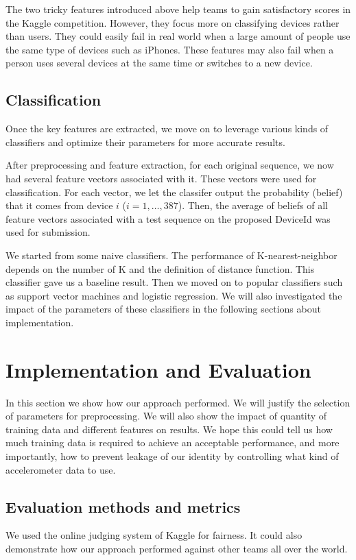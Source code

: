 \documentclass{article} %
\begin{document}
The two tricky features introduced above help teams to gain satisfactory scores in the Kaggle competition. However, they focus more on classifying devices rather than users. They could easily fail in real world when a large amount of people use the same type of devices such as iPhones. These features may also fail when a person uses several devices at the same time or switches to a new device.

\subsection{Classification}

Once the key features are extracted, we move on to leverage various kinds of classifiers and optimize their parameters for more accurate results.

After preprocessing and feature extraction, for each original sequence, we now had several feature vectors associated with it. These vectors were used for classification. For each vector, we let the classifer output the probability (belief) that it comes from device $i$ ($i=1,\ldots,387$). Then, the average of beliefs of all feature vectors associated with a test sequence on the proposed DeviceId was used for submission.

We started from some naive classifiers. The performance of K-nearest-neighbor depends on the number of K and the definition of distance function. This classifier gave us a baseline result. Then we moved on to popular classifiers such as support vector machines and logistic regression. We will also investigated the impact of the parameters of these classifiers in the following sections about implementation.


\section{Implementation and Evaluation}
In this section we show how our approach performed. We will justify the selection of parameters for preprocessing. We will also show the impact of quantity of training data and different features on results. We hope this could tell us how much training data is required to achieve an acceptable performance, and more importantly, how to prevent leakage of our identity by controlling what kind of accelerometer data to use.

\subsection{Evaluation methods and metrics}
We used the online judging system of Kaggle for fairness. It could also demonstrate how our approach performed against other teams all over the world. 
\end{document}
